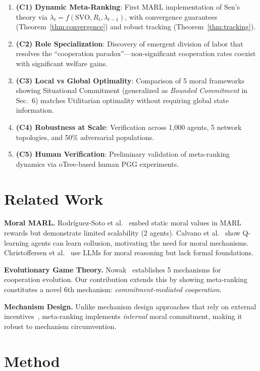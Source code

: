 \documentclass{article}
\begin{document}
\begin{enumerate}
    \item \textbf{(C1) Dynamic Meta-Ranking}: First MARL implementation of Sen's theory via $\lambda_t = f(\text{SVO}, R_t, \lambda_{t-1})$, with convergence guarantees (Theorem~\ref{thm:convergence}) and robust tracking (Theorem~\ref{thm:tracking}).
    \item \textbf{(C2) Role Specialization}: Discovery of emergent division of labor that resolves the ``cooperation paradox''---non-significant cooperation rates coexist with significant welfare gains.
    \item \textbf{(C3) Local vs Global Optimality}: Comparison of 5 moral frameworks showing Situational Commitment (generalized as \textit{Bounded Commitment} in Sec.~6) matches Utilitarian optimality without requiring global state information.
    \item \textbf{(C4) Robustness at Scale}: Verification across 1,000 agents, 5 network topologies, and 50\% adversarial populations.
    \item \textbf{(C5) Human Verification}: Preliminary validation of meta-ranking dynamics via oTree-based human PGG experiments.
\end{enumerate}

\section{Related Work}

\textbf{Moral MARL.}
Rodr\'iguez-Soto et al.~\cite{rodriguez2021multi} embed static moral values in MARL rewards but demonstrate limited scalability (2 agents).
Calvano et al.~\cite{calvano2020artificial} show Q-learning agents can learn collusion, motivating the need for moral mechanisms.
Christoffersen et al.~\cite{christoffersen2023get} use LLMs for moral reasoning but lack formal foundations.

\textbf{Evolutionary Game Theory.}
Nowak~\cite{nowak2006evolutionary} establishes 5 mechanisms for cooperation evolution.
Our contribution extends this by showing meta-ranking constitutes a novel 6th mechanism: \textit{commitment-mediated cooperation}.

\textbf{Mechanism Design.}
Unlike mechanism design approaches that rely on external incentives~\cite{hurwicz1973design}, meta-ranking implements \textit{internal} moral commitment, making it robust to mechanism circumvention.

\section{Method}
\end{document}
